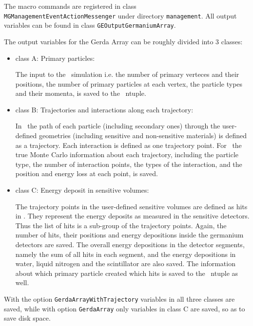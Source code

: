 The macro commands are registered in class 
\nolinkurl{MGManagementEventActionMessenger} 
under directory \nolinkurl{management}.
All output variables can be found in class
\nolinkurl{GEOutputGermaniumArray}.

The output variables for the Gerda Array can be 
roughly divided into 3 classes:

\begin{itemize}

\item class A: Primary particles: 

The input to the \mage\ simulation i.e. 
the number of primary verteces and their positions, 
the number of primary particles at each
vertex, the particle types and their momenta, is saved to the \rootv\
ntuple.

\item class B: Trajectories and interactions along each trajectory: 

In \geant\ the path of each particle
(including secondary ones) through the user-defined geometries
(including sensitive and non-sensitive materials) is defined as a
trajectory. Each interaction is defined as one trajectory point.
For \gerda\ the true Monte Carlo information about
each trajectory, including the particle type, the number of
interaction points, the types of the interaction,
and the position and energy loss at each point, is
saved.

\item class C: Energy deposit in sensitive volumes: 

The trajectory points in the user-defined sensitive volumes are
defined as hits in \geant. They represent the energy deposits as
measured in the sensitive detectors. Thus the list of hits is a
sub-group of the trajectory points.  Again, the number of hits,
their positions and energy depositions inside the germanium detectors are
saved.  The overall energy depositions in the detector segments, namely
the sum of all hits in each segment, and the energy depositions in water,
liquid nitrogen and the scintillator are also saved.  The information
about which primary particle created which hits is saved to the
\rootv\ ntuple as well.

\end{itemize}


With the option \nolinkurl{GerdaArrayWithTrajectory} 
variables in all three classes are saved,
while with option \nolinkurl{GerdaArray} only variables in class C
are saved, so as to save disk space. 

